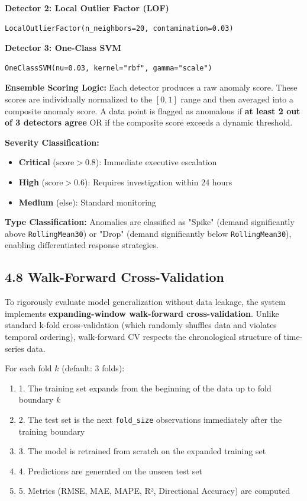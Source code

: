 \documentclass[12pt, a4paper]{report}
\begin{document}
\textbf{Detector 2: Local Outlier Factor (LOF)}
\begin{verbatim}
LocalOutlierFactor(n_neighbors=20, contamination=0.03)
\end{verbatim}

\textbf{Detector 3: One-Class SVM}
\begin{verbatim}
OneClassSVM(nu=0.03, kernel="rbf", gamma="scale")
\end{verbatim}

\textbf{Ensemble Scoring Logic:}
Each detector produces a raw anomaly score. These scores are individually normalized to the $[0, 1]$ range and then averaged into a composite anomaly score. A data point is flagged as anomalous if \textbf{at least 2 out of 3 detectors agree} OR if the composite score exceeds a dynamic threshold.

\textbf{Severity Classification:}
\begin{itemize}
\item \textbf{Critical} ($\text{score} > 0.8$): Immediate executive escalation
\item \textbf{High} ($\text{score} > 0.6$): Requires investigation within 24 hours
\item \textbf{Medium} (else): Standard monitoring
\end{itemize}

\textbf{Type Classification:} Anomalies are classified as "Spike" (demand significantly above \texttt{RollingMean30}) or "Drop" (demand significantly below \texttt{RollingMean30}), enabling differentiated response strategies.

\subsection{4.8 Walk-Forward Cross-Validation}

To rigorously evaluate model generalization without data leakage, the system implements \textbf{expanding-window walk-forward cross-validation}. Unlike standard k-fold cross-validation (which randomly shuffles data and violates temporal ordering), walk-forward CV respects the chronological structure of time-series data.

For each fold $k$ (default: 3 folds):
\begin{enumerate}
\item 1. The training set expands from the beginning of the data up to fold boundary $k$
\item 2. The test set is the next \texttt{fold\_size} observations immediately after the training boundary
\item 3. The model is retrained from scratch on the expanded training set
\item 4. Predictions are generated on the unseen test set
\item 5. Metrics (RMSE, MAE, MAPE, R², Directional Accuracy) are computed
\end{enumerate}
\end{document}
